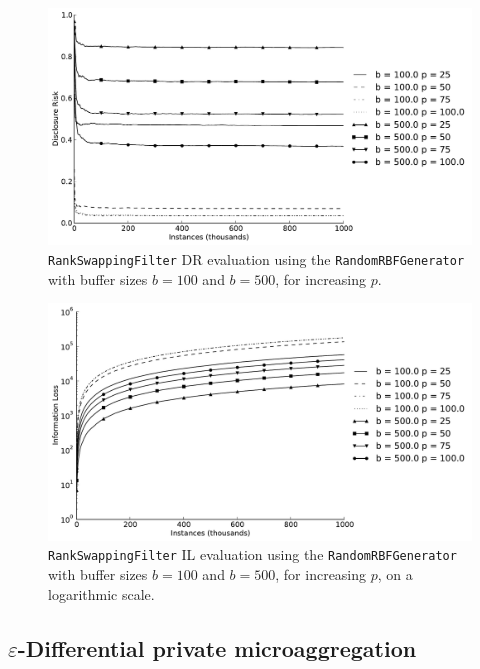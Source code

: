 \begin{figure}[h]
	\centering
	\includegraphics[width=1.0\linewidth]{figures/dr_rs-random.pdf}
	\caption[Rank swapping DR evaluation ($b = \{100,500\}$).]{\texttt{RankSwappingFilter} DR evaluation using the \texttt{RandomRBFGenerator} with buffer sizes $b = 100$ and $b = 500$, for increasing $p$.}
	\label{fig:results-dr-rs}
\end{figure}

\begin{figure}[h]
	\centering
	\includegraphics[width=1.0\linewidth]{figures/il-log_rs-random.pdf}
	\caption[Rank swapping IL evaluation ($b = \{100,500\}$), logarithmic scale.]{\texttt{RankSwappingFilter} IL evaluation using the \texttt{RandomRBFGenerator} with buffer sizes $b = 100$ and $b = 500$, for increasing $p$, on a logarithmic scale.}
	\label{fig:results-il-log-rs}
\end{figure}

\subsection{$\varepsilon$-Differential private microaggregation}
\label{Benchmarking:Results:DiffPriv}

